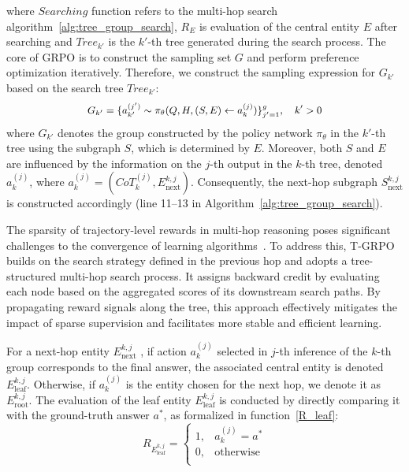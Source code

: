 \documentclass[letterpaper]{article} %
\begin{document}
\noindent where $Searching$ function refers to the multi-hop search algorithm~\ref{alg:tree_group_search}, $R_E$ is evaluation of the central entity $E$ after searching and $Tree_{k'}$ is the $k'$-th tree generated during the search process. The core of GRPO is to construct the sampling set $G$ and perform preference optimization iteratively. Therefore, we construct the sampling expression for $G_{k'}$ based on the search tree $Tree_{k'}$:
\begin{equation}  \small
	\begin{aligned}  
    G_{k'} = \{a_{k'}^{(j')} \sim \pi_\theta(Q, H, (S, E)\gets a_{k}^{(j)}) \}_{j'=1}^g, \quad k'> 0
	\end{aligned} 
    \label{group2}
\end{equation} 
\noindent where $G_{k'}$ denotes the group constructed by the policy network $\pi_\theta$ in the $k'$-th tree using the subgraph $S$, which is determined by $E$. Moreover, both $S$ and $E$ are influenced by the information on the $j$-th output in the $k$-th tree, denoted $a_k^{(j)}$, where $a_k^{(j)} = (CoT_{k}^{(j)}, E_\text{next}^{k,j})$.
Consequently, the next-hop subgraph $S_\text{next}^{k,j}$ is constructed accordingly (line 11–13 in Algorithm~\ref{alg:tree_group_search}).

The sparsity of trajectory-level rewards in multi-hop reasoning poses significant challenges to the convergence of learning algorithms~\cite{sparse2,sparse3}. To address this, T-GRPO builds on the search strategy defined in the previous hop and adopts a tree-structured multi-hop search process. It assigns backward credit by evaluating each node based on the aggregated scores of its downstream search paths. By propagating reward signals along the tree, this approach effectively mitigates the impact of sparse supervision and facilitates more stable and efficient learning.

For a next-hop entity $E_{\text{next}}^{k, j}$ , if action $a_k^{(j)}$ selected in $j$-th inference of the $k$-th group corresponds to the final answer, the associated central entity is denoted $E_{\text{leaf}}^{k, j}$. 
Otherwise, if $a_k^{(j)}$ is the entity chosen for the next hop, we denote it as $E_{\text{root}}^{k, j}$. The evaluation of the leaf entity $ E_{\text{leaf}}^{k, j}$ is conducted by directly comparing it with the ground-truth answer $a^*$, as formalized in function~\eqref{R_leaf}:
\begin{equation}
R_{E_\text{leaf}^{k,j}} = 
\begin{cases} 
1, &  a_k^{(j)} = a^* \\ 
0, & \text{otherwise} \\
\end{cases}
\label{R_leaf}
\end{equation}
\end{document}
